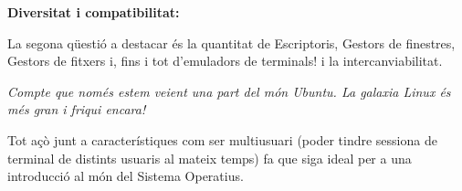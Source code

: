 \documentclass[
  a4paper,
]{article}
\begin{document}
\textbf{Diversitat i compatibilitat:}

La segona qüestió a destacar és la quantitat de Escriptoris, Gestors de
finestres, Gestors de fitxers i, fins i tot d'emuladors de terminals! i
la intercanviabilitat.

\emph{Compte que només estem veient una part del món Ubuntu. La galaxia
Linux és més gran i friqui encara!}

Tot açò junt a característiques com ser multiusuari (poder tindre
sessiona de terminal de distints usuaris al mateix temps) fa que siga
ideal per a una introducció al món del Sistema Operatius.
\end{document}
